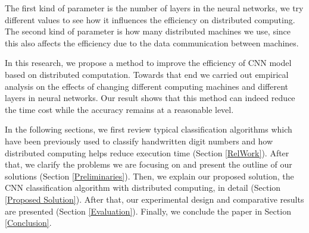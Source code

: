 The first kind of parameter is the number of layers in the neural networks, we try different values to see how it influences the efficiency on distributed computing. The second kind of parameter is how many distributed machines we use, since this also affects the efficiency due to the data communication between machines.


In this research, we propose a method to improve the efficiency of CNN model based on distributed computation. Towards that end we carried out empirical analysis on the effects of changing different computing machines and different layers in neural networks. Our result shows that this method can indeed reduce the time cost while the accuracy remains at a reasonable level.

In the following sections, we first review typical classification algorithms which have been previously used to classify handwritten digit numbers and how distributed computing helps reduce execution time (Section \ref{RelWork}). After that, we clarify the problems we are focusing on and present the outline of our solutions (Section \ref{Preliminaries}). Then, we explain our proposed solution, the CNN classification algorithm with distributed computing, in detail (Section \ref{Proposed Solution}). After that, our experimental design and comparative results are presented (Section \ref{Evaluation}). Finally, we conclude the paper in Section \ref{Conclusion}. 

